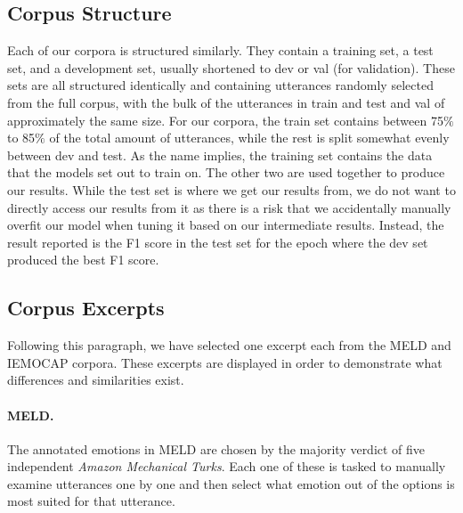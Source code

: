 \documentclass[nofilelist]{cslthse-msc}
\begin{document}
\subsection{Corpus Structure}
Each of our corpora is structured similarly. They contain a training set, a test set, and a development set, usually shortened to dev or val (for validation). These sets are all structured identically and containing utterances randomly selected from the full corpus, with the bulk of the utterances in train and test and val of approximately the same size. For our corpora, the train set contains between 75$\%$ to 85$\%$ of the total amount of utterances, while the rest is split somewhat evenly between dev and test. As the name implies, the training set contains the data that the models set out to train on. The other two are used together to produce our results. While the test set is where we get our results from, we do not want to directly access our results from it as there is a risk that we accidentally manually overfit our model when tuning it based on our intermediate results. Instead, the result reported is the F1 score in the test set for the epoch where the dev set produced the best F1 score. 


\subsection{Corpus Excerpts}
\label{corpus_excerpts}

Following this paragraph, we have selected one excerpt each from the MELD and IEMOCAP corpora. These excerpts are displayed in order to demonstrate what differences and similarities exist.

\paragraph{MELD.} The annotated emotions in MELD are chosen by the majority verdict of five independent \textit{Amazon Mechanical Turks}. Each one of these is tasked to manually examine utterances one by one and then select what emotion out of the options is most suited for that utterance. 
\newenvironment{pag}{\fontfamily{pag}\selectfont}{\par}
\end{document}
